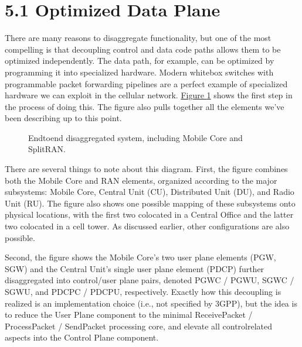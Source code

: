 \documentclass[a4paper,11pt,english]{sphinxmanual}
\let\sphinxpxdimen\pdfpxdimen\else\newdimen\sphinxpxdimen
\begin{document}
\section{5.1 Optimized Data Plane}
\label{\detokenize{disaggregate:optimized-data-plane}}
\sphinxAtStartPar
There are many reasons to disaggregate functionality, but one of the
most compelling is that decoupling control and data code paths allows
them to be optimized independently. The data path, for example, can be
optimized by
programming it into specialized hardware. Modern white\sphinxhyphen{}box switches with
programmable packet forwarding pipelines are a perfect example of
specialized hardware we can exploit in the cellular network.
\hyperref[\detokenize{disaggregate:fig-e2e}]{Figure \ref{\detokenize{disaggregate:fig-e2e}}} shows the first step in the process
of doing this. The figure also pulls together all the elements we’ve
been describing up to this point.

\begin{figure}[ht]
\centering
\capstart

\noindent\sphinxincludegraphics[width=600\sphinxpxdimen]{{Slide21}.png}
\caption{End\sphinxhyphen{}to\sphinxhyphen{}end disaggregated system, including Mobile Core
and Split\sphinxhyphen{}RAN.}\label{\detokenize{disaggregate:id1}}\label{\detokenize{disaggregate:fig-e2e}}\end{figure}

\sphinxAtStartPar
There are several things to note
about this diagram. First, the figure combines both the Mobile Core and RAN elements,
organized according to the major subsystems: Mobile Core, Central Unit
(CU), Distributed Unit (DU), and Radio Unit (RU). The figure also shows
one possible mapping of these subsystems onto physical locations, with
the first two co\sphinxhyphen{}located in a Central Office and the latter two
co\sphinxhyphen{}located in a cell tower. As discussed earlier, other configurations
are also possible.

\sphinxAtStartPar
Second, the figure shows the Mobile Core’s two user plane elements
(PGW, SGW) and the Central Unit’s single user plane element (PDCP)
further disaggregated into control/user plane pairs, denoted PGW\sphinxhyphen{}C /
PGW\sphinxhyphen{}U, SGW\sphinxhyphen{}C / SGW\sphinxhyphen{}U, and PDCP\sphinxhyphen{}C / PDCP\sphinxhyphen{}U, respectively. Exactly how
this decoupling is realized is an implementation choice (i.e., not
specified by 3GPP), but the idea is to reduce the User Plane component
to the minimal Receive\sphinxhyphen{}Packet / Process\sphinxhyphen{}Packet / Send\sphinxhyphen{}Packet
processing core, and elevate all control\sphinxhyphen{}related aspects into the
Control Plane component.
\end{document}
